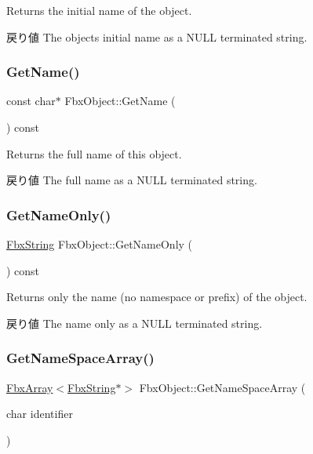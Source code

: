 Returns the initial name of the object. \begin{DoxyReturn}{戻り値}
The object\textquotesingle{}s initial name as a {\ttfamily N\+U\+LL} terminated string. 
\end{DoxyReturn}
\mbox{\label{class_fbx_object_adb6c3656e49af96b64020991b5406ce2}} 
\subsubsection{\texorpdfstring{Get\+Name()}{GetName()}}
{\footnotesize\ttfamily const char$\ast$ Fbx\+Object\+::\+Get\+Name (\begin{DoxyParamCaption}{ }\end{DoxyParamCaption}) const}

Returns the full name of this object. \begin{DoxyReturn}{戻り値}
The full name as a {\ttfamily N\+U\+LL} terminated string. 
\end{DoxyReturn}
\mbox{\label{class_fbx_object_a3a01a4d055e558d322016ce8d7337329}} 
\subsubsection{\texorpdfstring{Get\+Name\+Only()}{GetNameOnly()}}
{\footnotesize\ttfamily \hyperlink{class_fbx_string}{Fbx\+String} Fbx\+Object\+::\+Get\+Name\+Only (\begin{DoxyParamCaption}{ }\end{DoxyParamCaption}) const}

Returns only the name (no namespace or prefix) of the object. \begin{DoxyReturn}{戻り値}
The name only as a {\ttfamily N\+U\+LL} terminated string. 
\end{DoxyReturn}
\mbox{\label{class_fbx_object_a2367b010ddd5ca21b37b5c7ddff0e781}} 
\subsubsection{\texorpdfstring{Get\+Name\+Space\+Array()}{GetNameSpaceArray()}}
{\footnotesize\ttfamily \hyperlink{class_fbx_array}{Fbx\+Array}$<$\hyperlink{class_fbx_string}{Fbx\+String}$\ast$$>$ Fbx\+Object\+::\+Get\+Name\+Space\+Array (\begin{DoxyParamCaption}\item[{char}]{identifier }\end{DoxyParamCaption})}

